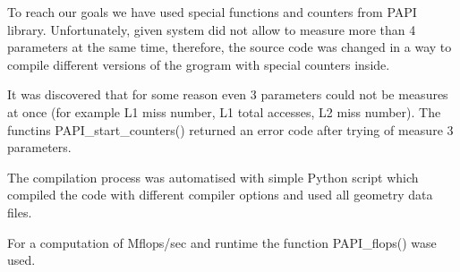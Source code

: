 \documentclass[utf8,12pt]{report}
\begin{document}
To reach our goals we have used special functions and counters from PAPI library.
Unfortunately, given system did not allow to measure more than 4 parameters at the same time, therefore, the source code was changed in a way to compile different versions of the grogram with special counters inside.

It was discovered that for some reason even 3 parameters could not be measures at once (for example L1 miss number, L1 total accesses, L2 miss number).
The functins PAPI\_start\_counters() returned an error code after trying of measure 3 parameters.

The compilation process was automatised with simple Python script which compiled the code with different compiler options and used all geometry data files.

For a computation of Mflops/sec and runtime the function PAPI\_flops() wase used.
\end{document}
